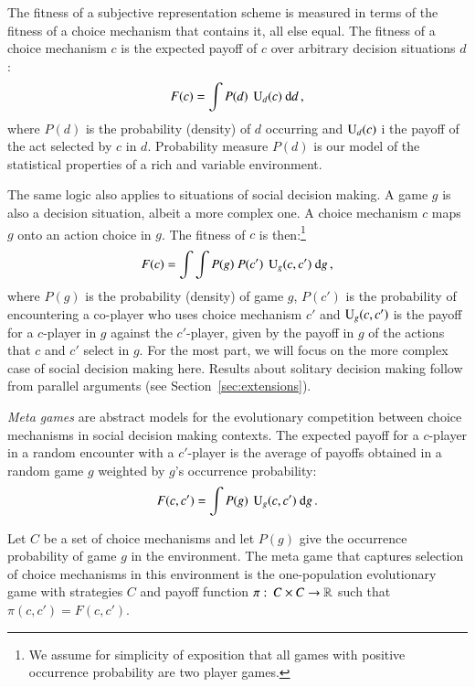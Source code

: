 \documentclass[fleqn,reqno,11pt]{article}
\begin{document}
The fitness of a subjective representation scheme is measured in terms of the fitness of a
choice mechanism that contains it, all else equal. The fitness of a choice mechanism $c$ is the
expected payoff of $c$ over arbitrary decision situations $d$:
\begin{align}
  \label{eq:FittnessChoiceMechSolitary}
  F(c) = \int P(d) \  \operatorname{U}_d(c) \text{ d} d \,,
\end{align}
where $P(d)$ is the probability (density) of $d$ occurring and $\operatorname{U}_d(c)$ i the payoff of
the act selected by $c$ in $d$. Probability measure $P(d)$ is our model of the statistical
properties of a rich and variable environment.

The same logic also applies to situations of social decision making. A game $g$ is also a
decision situation, albeit a more complex one. A choice mechanism $c$ maps $g$ onto an action
choice in $g$. The fitness of $c$ is then:\footnote{We assume for simplicity of exposition that
  all games with positive occurrence probability are two player games.}
\begin{align}
  \label{eq:FittnessChoiceMechGame}
  F(c) = \int \int P(g) \  P(c') \  \operatorname{U}_g(c,c') \text{ d} g \,,
\end{align}
where $P(g)$ is the probability (density) of game $g$, $P(c')$ is the probability of
encountering a co-player who uses choice mechanism $c'$ and $\operatorname{U}_g(c,c')$ is the payoff for
a $c$-player in $g$ against the $c'$-player, given by the payoff in $g$ of the actions that $c$
and $c'$ select in $g$. For the most part, we will focus on the more complex case of social
decision making here. Results about solitary decision making follow from parallel arguments
(see Section~\ref{sec:extensions}).

\emph{Meta games} are abstract models for the evolutionary competition between choice
mechanisms in social decision making contexts. The expected payoff for a $c$-player in a random
encounter with a $c'$-player is the average of payoffs obtained in a random game $g$ weighted
by $g$'s occurrence probability:
\begin{align}
  F(c, c') = \int P(g) \  \operatorname{U}_g(c,c') \text{ d} g \,.
\end{align}

\begin{definition}
  \label{def:MetaGame}
  Let $C$ be a set of choice mechanisms and let $P(g)$ give the occurrence probability of game
  $g$ in the environment. The meta game that captures selection of choice mechanisms in this
  environment is the one-population evolutionary game with strategies $C$ and payoff function
  $\pi \thinspace \colon \thinspace C \times C \rightarrow \mathbb{R}$ such that
  $\pi(c,c') = F(c,c')$.
\end{definition}
\end{document}
